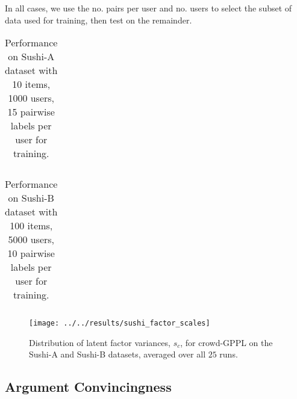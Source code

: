 


In all cases, we use the no. pairs per user and no. users to select the subset of data used for training, then test on the remainder.

\begin{table}
\begin{tabularx}{\textwidth}{| l | c | c | c | c |}
\\ \hline
\\ \hline
\end{tabularx}
\caption{Performance on Sushi-A dataset with 10 items, 1000 users, 15 pairwise labels per user for training.}
\end{table}

\begin{table}
\begin{tabularx}{\textwidth}{| l | c | c | c | c |}
\\ \hline
\\ \hline
\end{tabularx}
\caption{Performance on Sushi-B dataset with 100 items, 5000 users, 10 pairwise labels per user for training.}
\end{table}

\begin{figure}
\texttt{[image: ../../results/sushi\_factor\_scales]}
\caption{
Distribution of latent factor variances, $s_c$, for crowd-GPPL on the Sushi-A and Sushi-B datasets, averaged over all $25$ runs.
}
\end{figure}

\subsection{Argument Convincingness}\label{sec:exp_nlp}

